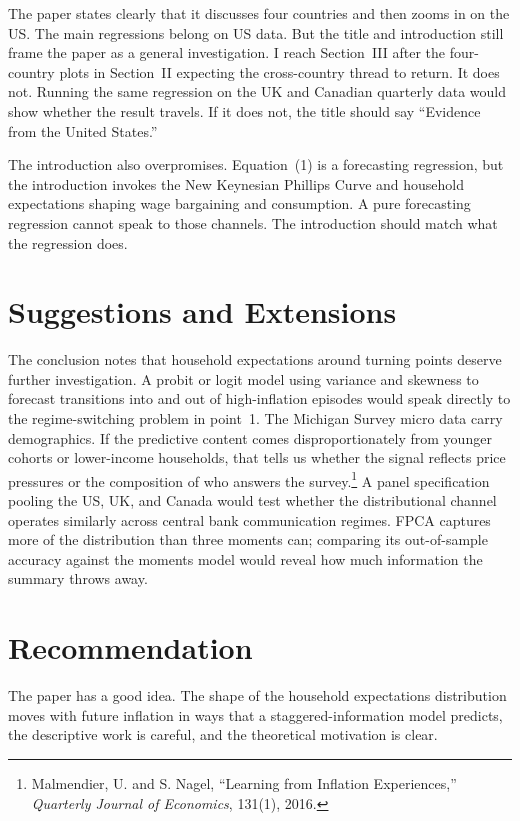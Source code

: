 \documentclass[11pt, a4paper]{article}
\begin{document}
The paper states clearly that it discusses four countries and then zooms in on the US. The main regressions belong on US data. But the title and introduction still frame the paper as a general investigation. I reach Section~III after the four-country plots in Section~II expecting the cross-country thread to return. It does not. Running the same regression on the UK and Canadian quarterly data would show whether the result travels. If it does not, the title should say ``Evidence from the United States.''

The introduction also overpromises. Equation~(1) is a forecasting regression, but the introduction invokes the New Keynesian Phillips Curve and household expectations shaping wage bargaining and consumption. A pure forecasting regression cannot speak to those channels. The introduction should match what the regression does.

\section{Suggestions and Extensions}

The conclusion notes that household expectations around turning points deserve further investigation. A probit or logit model using variance and skewness to forecast transitions into and out of high-inflation episodes would speak directly to the regime-switching problem in point~1. The Michigan Survey micro data carry demographics. If the predictive content comes disproportionately from younger cohorts or lower-income households, that tells us whether the signal reflects price pressures or the composition of who answers the survey.\footnote{Malmendier, U. and S. Nagel, ``Learning from Inflation Experiences,'' \textit{Quarterly Journal of Economics}, 131(1), 2016.} A panel specification pooling the US, UK, and Canada would test whether the distributional channel operates similarly across central bank communication regimes. FPCA captures more of the distribution than three moments can; comparing its out-of-sample accuracy against the moments model would reveal how much information the summary throws away.

\section{Recommendation}

The paper has a good idea. The shape of the household expectations distribution moves with future inflation in ways that a staggered-information model predicts, the descriptive work is careful, and the theoretical motivation is clear.
\end{document}
